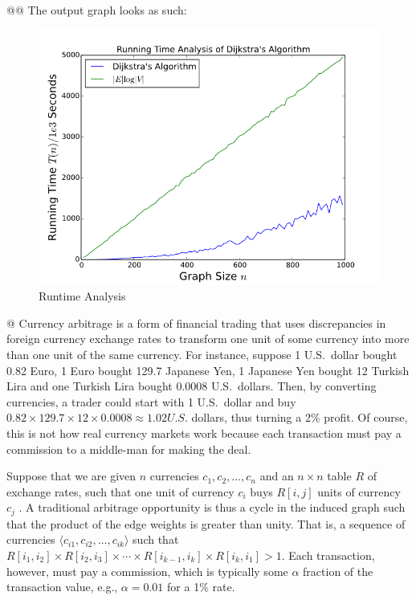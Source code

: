 \documentclass[10pt]{article}\usepackage[]{graphicx}\usepackage[]{xcolor}
\begin{document}
\begin{easylist}[enumerate]
    @@ The output graph looks as such:

    \begin{figure}[H]
        \centering
        \includegraphics[scale=0.6]{./img/runtimeanalysis.png}
        \caption{Runtime Analysis}
    \end{figure}

    @ Currency arbitrage is a form of financial trading that uses discrepancies in foreign currency exchange rates to
    transform one unit of some currency into more than one unit of the same currency. For instance, suppose 1 U.S.\
    dollar bought 0.82 Euro, 1 Euro bought 129.7 Japanese Yen, 1 Japanese Yen bought 12 Turkish Lira and one Turkish
    Lira bought 0.0008 U.S.\ dollars. Then, by converting currencies, a trader could start with 1 U.S.\ dollar and buy
    $0.82 \times 129.7 \times 12 \times 0.0008 \approx 1.02 U.S.$ dollars, thus turning a 2\% profit. Of course, this is
    not how real currency markets work because each transaction must pay a commission to a middle-man for making the
    deal.

    Suppose that we are given $n$ currencies $c_1 , c_2 , \ldots , c_n$ and an $n \times n$ table $R$ of exchange rates,
    such that one unit of currency $c_i$ buys $R[i, j]$ units of currency $c_j$ . A traditional arbitrage opportunity is
    thus a cycle in the induced graph such that the product of the edge weights is greater than unity. That is, a
    sequence of currencies $\langle c_{i1} , c_{i 2} ,\ldots , c_{i k} \rangle$ such that $R[i_1 , i_2] \times R[i_2 ,
    i_3] \times \cdots \times R[i_{k-1} , i_k ] \times R[i_k , i_1 ] > 1$. Each transaction, however, must pay a
    commission, which is typically some $\alpha$ fraction of the transaction value, e.g., $\alpha = 0.01$ for a 1\%
    rate.


\end{easylist}
\end{document}
